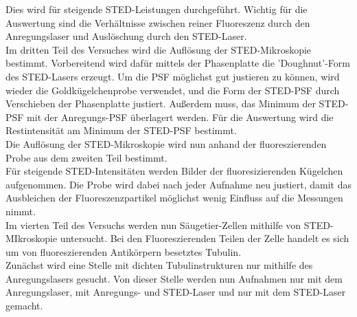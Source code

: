 Dies wird für steigende STED-Leistungen durchgeführt. 
Wichtig für die Auswertung sind die Verhältnisse zwischen reiner Fluoreszenz durch den Anregungslaser und Auslöschung durch den STED-Laser.
\\
Im dritten Teil des Versuches wird die Auflösung der STED-Mikroskopie bestimmt.
Vorbereitend wird dafür mittels der Phasenplatte die 'Doughnut'-Form des STED-Lasers erzeugt. 
Um die PSF möglichst gut justieren zu können, wird wieder die Goldkügelchenprobe verwendet, und die Form der STED-PSF durch Verschieben der Phasenplatte justiert.
Außerdem muss, das Minimum der STED-PSF mit der Anregungs-PSF überlagert werden.
Für die Auswertung wird die Restintensität am Minimum der STED-PSF bestimmt.
\\
Die Auflösung der STED-Mikroskopie wird nun anhand der fluoreszierenden Probe aus dem zweiten Teil bestimmt.
\\
Für steigende STED-Intensitäten werden Bilder der fluoresizierenden Kügelchen aufgenommen. 
Die Probe wird dabei nach jeder Aufnahme neu justiert, damit das Ausbleichen der Fluoreszenzpartikel möglichst wenig Einfluss auf die Messungen nimmt.
\\
Im vierten Teil des Versuchs werden nun Säugetier-Zellen mithilfe von STED-MIkroskopie untersucht.
Bei den Fluoreszierenden Teilen der Zelle handelt es sich um von fluoreszierenden Antikörpern besetztes Tubulin.
\\
Zunächst wird eine Stelle mit dichten Tubulinstrukturen nur mithilfe des Anregungslasers gesucht.
Von dieser Stelle werden nun Aufnahmen nur mit dem Anregungslaser, mit Anregungs- und STED-Laser und nur mit dem STED-Laser gemacht.
